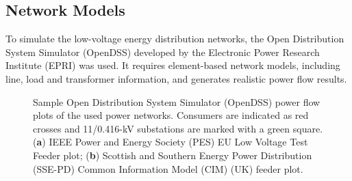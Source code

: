 \subsection{Network Models}

To simulate the low-voltage energy distribution networks, the Open Distribution System Simulator (OpenDSS) developed by the Electronic Power Research Institute (EPRI) was used. It requires element-based network models, including line, load and transformer information, and generates realistic power flow results.

\begin{figure}\centering
 \caption{Sample Open Distribution System Simulator (OpenDSS) power flow plots of the used power networks. Consumers are indicated as red crosses and 11/0.416-kV substations are marked with a green square. (\textbf{a}) IEEE Power and Energy Society (PES) EU Low Voltage Test Feeder plot; (\textbf{b}) Scottish and Southern Energy Power Distribution (SSE-PD) Common Information Model (CIM) (UK) feeder plot.}
 \label{fig-feeders}%
\end{figure}


